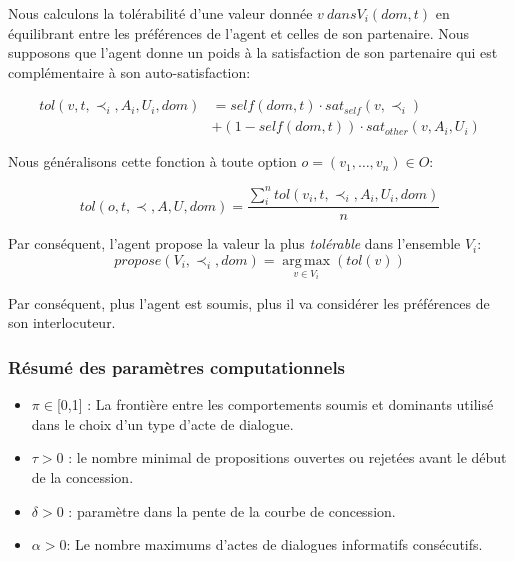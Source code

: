 	Nous calculons la tolérabilité d'une valeur donnée $ v \ dans V_i (dom, t) $ en équilibrant entre les préférences de l'agent et celles de son partenaire. Nous supposons que l'agent donne un poids à la satisfaction de son partenaire qui est complémentaire à son auto-satisfaction:
	
	\begin{equation}
	\begin{split}
	tol(v, t, \prec_i, A_i, U_i, dom) & = self(dom, t)  \cdot sat_{self}(v, \prec_i) \\
	& +  (1 - self(dom, t)) \cdot sat_{other}(v, A_i, U_i)
	\end{split} 
	\end{equation}
	

	Nous généralisons cette fonction à toute option $o=(v_1,\ldots,v_n) \in O$:
	
	\begin{equation}
	tol(o, t, \prec, A, U, dom) = \frac{ \sum_{i}^{n} tol(v_i, t, \prec_i, A_i, U_i, dom) } {n}
	\end{equation}
	
	\noindent
	Par conséquent, l'agent propose la valeur la plus \emph{tolérable} dans l'ensemble $V_i$:
	\begin{equation}
	propose(V_i, \prec_i,dom) =  \operatorname*{arg\,max}_{v \in V_i} ( tol(v))
	\end{equation}
	
	Par conséquent, plus l'agent est soumis, plus il va considérer les préférences de son interlocuteur.
	
	\subsubsection*{Résumé des paramètres computationnels}
	\begin{itemize}[noitemsep]
		
		\item $\pi \in $[0,1] : La frontière entre  les comportements soumis et dominants utilisé dans le choix d'un type d'acte de dialogue.
		\item $\tau > 0$ : le nombre minimal de propositions ouvertes ou rejetées avant le début de la concession.
		\item $\delta > 0$ : paramètre dans la pente de la courbe de concession.
		\item $\alpha> 0$: Le nombre maximums d'actes de dialogues informatifs consécutifs.
	\end{itemize}
	

